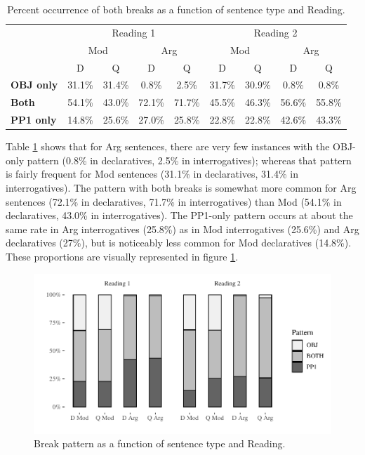 \documentclass[12pt,oneside]{book}
\begin{document}
\begin{table}[!h]

\caption{\label{tab:bothbreaks}Percent occurrence of both breaks as a function of sentence type and Reading.}
\centering
\begin{tabular}{>{\bfseries}lcccccccc}
\toprule
\multicolumn{1}{c}{ } & \multicolumn{4}{c}{Reading 1} & \multicolumn{4}{c}{Reading 2} \\
\cmidrule(l{3pt}r{3pt}){2-5} \cmidrule(l{3pt}r{3pt}){6-9}
\multicolumn{1}{c}{ } & \multicolumn{2}{c}{Mod} & \multicolumn{2}{c}{Arg} & \multicolumn{2}{c}{Mod} & \multicolumn{2}{c}{Arg} \\
\cmidrule(l{3pt}r{3pt}){2-3} \cmidrule(l{3pt}r{3pt}){4-5} \cmidrule(l{3pt}r{3pt}){6-7} \cmidrule(l{3pt}r{3pt}){8-9}
  & D & Q & D & Q & D & Q & D & Q\\
\midrule
OBJ only & 31.1\% & 31.4\% & 0.8\% & 2.5\% & 31.7\% & 30.9\% & 0.8\% & 0.8\%\\
Both & 54.1\% & 43.0\% & 72.1\% & 71.7\% & 45.5\% & 46.3\% & 56.6\% & 55.8\%\\
PP1 only & 14.8\% & 25.6\% & 27.0\% & 25.8\% & 22.8\% & 22.8\% & 42.6\% & 43.3\%\\
\bottomrule
\end{tabular}
\end{table}

Table \ref{tab:bothbreaks} shows that for Arg sentences, there are very few instances with the OBJ-only pattern (0.8\% in declaratives, 2.5\% in interrogatives); whereas that pattern is fairly frequent for Mod sentences (31.1\% in declaratives, 31.4\% in interrogatives). The pattern with both breaks is somewhat more common for Arg sentences (72.1\% in declaratives, 71.7\% in interrogatives) than Mod (54.1\% in declaratives, 43.0\% in interrogatives). The PP1-only pattern occurs at about the same rate in Arg interrogatives (25.8\%) as in Mod interrogatives (25.6\%) and Arg declaratives (27\%), but is noticeably less common for Mod declaratives (14.8\%). These proportions are visually represented in figure \ref{fig:bothbreaks2}.

\begin{figure}
\centering
\includegraphics{4-results_files/figure-latex/bothbreaks2-1.pdf}
\caption{\label{fig:bothbreaks2}Break pattern as a function of sentence type and Reading.}
\end{figure}
\end{document}
